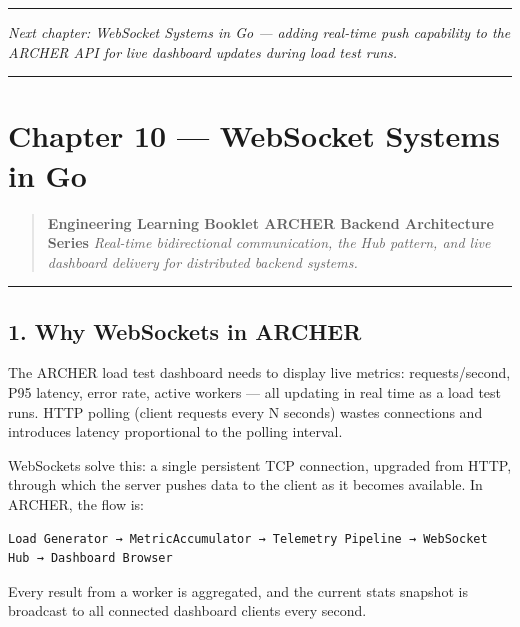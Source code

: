 \documentclass[
]{article}
\begin{document}
\begin{center}\rule{0.5\linewidth}{0.5pt}\end{center}

\emph{Next chapter: WebSocket Systems in Go --- adding real-time push
capability to the ARCHER API for live dashboard updates during load test
runs.}

\begin{center}\rule{0.5\linewidth}{0.5pt}\end{center}

\hypertarget{chapter-10-websocket-systems-in-go}{%
\section{Chapter 10 --- WebSocket Systems in
Go}\label{chapter-10-websocket-systems-in-go}}

\begin{quote}
\textbf{Engineering Learning Booklet \textbar{} ARCHER Backend
Architecture Series} \emph{Real-time bidirectional communication, the
Hub pattern, and live dashboard delivery for distributed backend
systems.}
\end{quote}

\begin{center}\rule{0.5\linewidth}{0.5pt}\end{center}

\hypertarget{why-websockets-in-archer}{%
\subsection{1. Why WebSockets in
ARCHER}\label{why-websockets-in-archer}}

The ARCHER load test dashboard needs to display live metrics:
requests/second, P95 latency, error rate, active workers --- all
updating in real time as a load test runs. HTTP polling (client requests
every N seconds) wastes connections and introduces latency proportional
to the polling interval.

WebSockets solve this: a single persistent TCP connection, upgraded from
HTTP, through which the server pushes data to the client as it becomes
available. In ARCHER, the flow is:

\begin{verbatim}
Load Generator → MetricAccumulator → Telemetry Pipeline → WebSocket Hub → Dashboard Browser
\end{verbatim}

Every result from a worker is aggregated, and the current stats snapshot
is broadcast to all connected dashboard clients every second.
\end{document}
